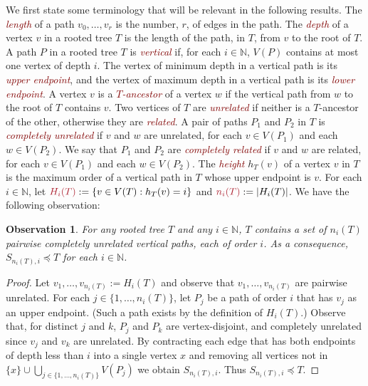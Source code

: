 \documentclass{patmorin}
\newcommand{\defn}[1]{\textcolor{Maroon}{\emph{#1}}}
\newcommand{\mathdefn}[1]{\textcolor{Maroon}{#1}}
\newcommand{\N}{\mathbb{N}}
\theoremstyle{plain}
\newtheorem{obs}[thm]{Observation}
\theoremstyle{definition}
\begin{document}
We first state some terminology that will be relevant in the following results. The \defn{length} of a path $v_0,\ldots,v_r$ is the number, $r$, of edges in the path. The \defn{depth} of a vertex $v$ in a rooted tree $T$ is the length of the path, in $T$, from $v$ to the root of $T$. A path $P$ in a rooted tree $T$ is \defn{vertical} if, for each $i\in\N$, $V(P)$ contains at most one vertex of depth $i$. The vertex of minimum depth in a vertical path is its \defn{upper endpoint}, and the vertex of maximum depth in a vertical path is its \defn{lower endpoint}. A vertex $v$ is a \defn{$T$-ancestor} of a vertex $w$ if the vertical path from $w$ to the root of $T$ contains $v$.  Two vertices of $T$ are \defn{unrelated} if neither is a $T$-ancestor of the other, otherwise they are \defn{related}.  A pair of paths $P_1$ and $P_2$ in $T$ is \defn{completely unrelated} if $v$ and $w$ are unrelated, for each $v\in V(P_1)$ and each $w\in V(P_2)$.  We say that $P_1$ and $P_2$ are \defn{completely related} if $v$ and $w$ are related, for each $v\in V(P_1)$ and each $w\in V(P_2)$. The \defn{height} $h_T(v)$ of a vertex $v$ in $T$ is the maximum order of a vertical path in $T$ whose upper endpoint is $v$.  For each $i\in\N$, let $\mathdefn{H_i(T)}:=\{v\in V(T):h_T(v)=i\}$ and $\mathdefn{n_i(T)}:=|H_i(T)|$.   We have the following observation:

\begin{obs}\label{same_height_unrelated}
  For any rooted tree $T$ and any $i\in\N$, $T$ contains a set of $n_i(T)$ pairwise completely unrelated vertical paths, each of order $i$.  As a consequence, $S_{n_i(T),i}\preceq T$ for each $i\in\N$. 
\end{obs}

\begin{proof}
  Let $v_1,\ldots,v_{n_i(T)}:= H_i(T)$ and observe that $v_1,\ldots,v_{n_i(T)}$ are pairwise unrelated.  For each $j\in\{1,\ldots,n_i(T)\}$, let $P_j$ be a path of order $i$ that has $v_j$ as an upper endpoint. (Such a path exists by the definition of $H_i(T)$.)  Observe that, for distinct $j$ and $k$, $P_j$ and $P_k$ are vertex-disjoint, and completely unrelated since $v_j$ and $v_k$ are unrelated. By contracting each edge that has both endpoints of depth less than $i$ into a single vertex $x$ and removing all vertices not in $\{x\}\cup\bigcup_{j\in\{1,\ldots,n_i(T)\}} V(P_j)$ we obtain $S_{n_i(T),i}$. Thus $S_{n_i(T),i}\preceq T$. 
\end{proof}
\end{document}
